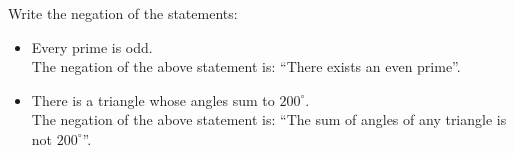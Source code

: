 \guard



\begin{exmp}
\label{exmp:negateQuantifiedStatement}
	Write the negation of the statements:
	\begin{itemize}
		\item Every prime is odd.\\
			The negation of the above statement is: ``There exists an even prime''.
		\item There is a triangle whose angles sum to $200^\circ$.\\
			The negation of the above statement is: ``The sum of angles of any triangle is not $200^\circ$''.
	\end{itemize}
\end{exmp}
